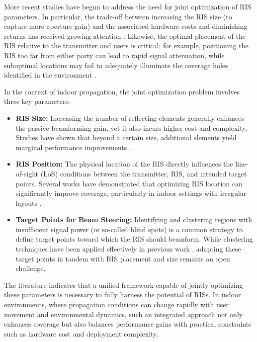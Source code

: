 \documentclass{IEEEoj}
\begin{document}
More recent studies have begun to address the need for joint optimization of RIS parameters. In particular, the trade-off between increasing the RIS size (to capture more aperture gain) and the associated hardware costs and diminishing returns has received growing attention \cite{turn0academia10}. Likewise, the optimal placement of the RIS relative to the transmitter and users is critical; for example, positioning the RIS too far from either party can lead to rapid signal attenuation, while suboptimal locations may fail to adequately illuminate the coverage holes identified in the environment \cite{turn0academia9}.

In the context of indoor propagation, the joint optimization problem involves three key parameters:
\begin{itemize}
	\item \textbf{RIS Size:} Increasing the number of reflecting elements generally enhances the passive beamforming gain, yet it also incurs higher cost and complexity. Studies have shown that beyond a certain size, additional elements yield marginal performance improvements \cite{liu2021reconfigurable}.
	\item \textbf{RIS Position:} The physical location of the RIS directly influences the line-of-sight (LoS) conditions between the transmitter, RIS, and intended target points. Several works have demonstrated that optimizing RIS location can significantly improve coverage, particularly in indoor settings with irregular layouts \cite{pan2021reconfigurable}.
	\item \textbf{Target Points for Beam Steering:} Identifying and clustering regions with insufficient signal power (or so-called blind spots) is a common strategy to define target points toward which the RIS should beamform. While clustering techniques have been applied effectively in previous work \cite{emre_claude_eucap_paper}, adapting these target points in tandem with RIS placement and size remains an open challenge.
\end{itemize}

The literature indicates that a unified framework capable of jointly optimizing these parameters is necessary to fully harness the potential of RISs. In indoor environments, where propagation conditions can change rapidly with user movement and environmental dynamics, such an integrated approach not only enhances coverage but also balances performance gains with practical constraints such as hardware cost and deployment complexity.
\end{document}
